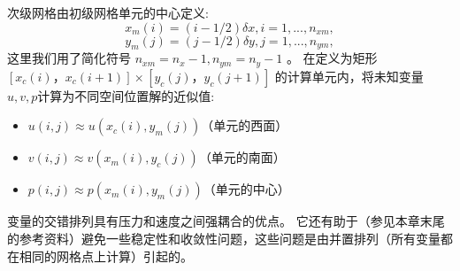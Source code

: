 \documentclass{ctexart}
\begin{document}
次级网格由初级网格单元的中心定义:
\begin{equation} \label{eq:xm}
    x_m(i) = (i - 1/2)\delta x,  i = 1,...,n_{xm},
\end{equation}
\begin{equation} \label{eq:ym}
    y_m(j) = (j - 1/2)\delta y,  j = 1,...,n_{ym},
\end{equation}
这里我们用了简化符号 $n_{xm} = n_x - 1,  n_{ym} =n_y-1$ 。
在定义为矩形$[x_c(i)，x_c(i + 1)] \times [y_c(j)， y_c(j + 1)]$
的计算单元内，将未知变量$u, v, p$计算为不同空间位置解的近似值:
\begin{itemize}
    \item $u(i,j) \approx u(x_c(i),y_m(j)) $（单元的西面）
    \item $ v(i,j) \approx v(x_m(i),y_c(j)) $（单元的南面）
    \item $ p(i,j) \approx p(x_m(i),y_m(j)) $（单元的中心）
\end{itemize}
变量的交错排列具有压力和速度之间强耦合的优点。
它还有助于（参见本章末尾的参考资料）避免一些稳定性和收敛性问题，这些问题是由并置排列（所有变量都在相同的网格点上计算）引起的。



\end{document}
